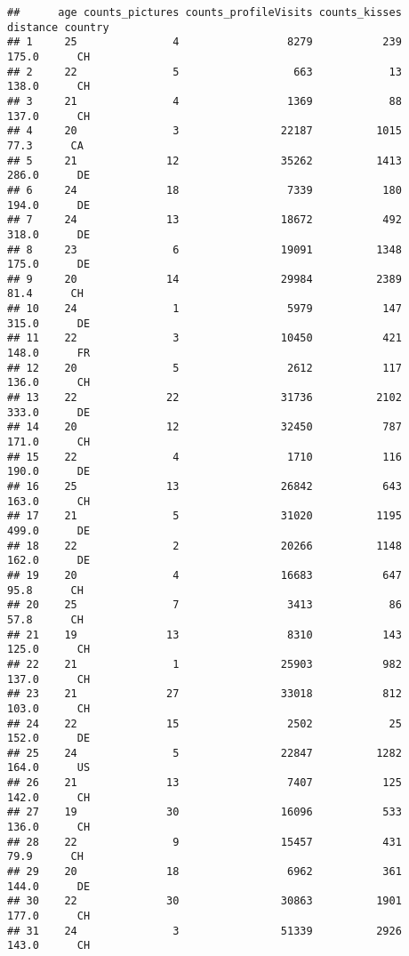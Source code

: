 \documentclass[
]{article}
\begin{document}
\begin{verbatim}
##      age counts_pictures counts_profileVisits counts_kisses distance country
## 1     25               4                 8279           239    175.0      CH
## 2     22               5                  663            13    138.0      CH
## 3     21               4                 1369            88    137.0      CH
## 4     20               3                22187          1015     77.3      CA
## 5     21              12                35262          1413    286.0      DE
## 6     24              18                 7339           180    194.0      DE
## 7     24              13                18672           492    318.0      DE
## 8     23               6                19091          1348    175.0      DE
## 9     20              14                29984          2389     81.4      CH
## 10    24               1                 5979           147    315.0      DE
## 11    22               3                10450           421    148.0      FR
## 12    20               5                 2612           117    136.0      CH
## 13    22              22                31736          2102    333.0      DE
## 14    20              12                32450           787    171.0      CH
## 15    22               4                 1710           116    190.0      DE
## 16    25              13                26842           643    163.0      CH
## 17    21               5                31020          1195    499.0      DE
## 18    22               2                20266          1148    162.0      DE
## 19    20               4                16683           647     95.8      CH
## 20    25               7                 3413            86     57.8      CH
## 21    19              13                 8310           143    125.0      CH
## 22    21               1                25903           982    137.0      CH
## 23    21              27                33018           812    103.0      CH
## 24    22              15                 2502            25    152.0      DE
## 25    24               5                22847          1282    164.0      US
## 26    21              13                 7407           125    142.0      CH
## 27    19              30                16096           533    136.0      CH
## 28    22               9                15457           431     79.9      CH
## 29    20              18                 6962           361    144.0      DE
## 30    22              30                30863          1901    177.0      CH
## 31    24               3                51339          2926    143.0      CH

\end{verbatim}
\end{document}
